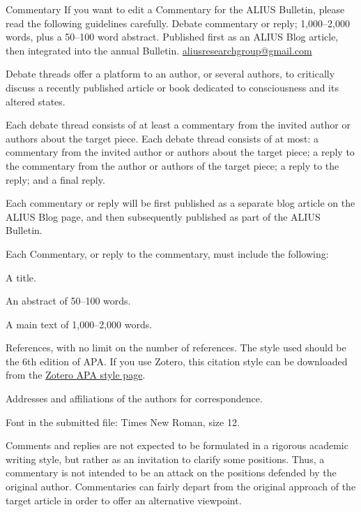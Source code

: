 \documentclass[11pt]{article}
\begin{document}
\guideHeader
  {Commentary}
  {If you want to edit a Commentary for the ALIUS Bulletin, please read the following guidelines carefully.}
  {Debate commentary or reply; 1,000--2,000 words, plus a 50--100 word abstract.}
  {Published first as an ALIUS Blog article, then integrated into the annual Bulletin.}
  {\href{mailto:aliusresearchgroup@gmail.com}{aliusresearchgroup@gmail.com}}

Debate threads offer a platform to an author, or several authors, to critically discuss a recently published article or book dedicated to consciousness and its altered states.

Each debate thread consists of at least a commentary from the invited author or authors about the target piece. Each debate thread consists of at most: a commentary from the invited author or authors about the target piece; a reply to the commentary from the author or authors of the target piece; a reply to the reply; and a final reply.

Each commentary or reply will be first published as a separate blog article on the ALIUS Blog page, and then subsequently published as part of the ALIUS Bulletin.


Each Commentary, or reply to the commentary, must include the following:

\begin{guideChecklist}
\item A title.
\item An abstract of 50--100 words.
\item A main text of 1,000--2,000 words.
\item References, with no limit on the number of references. The style used should be the 6th edition of APA. If you use Zotero, this citation style can be downloaded from the \href{https://www.zotero.org/styles?q=id%3Aapa}{Zotero APA style page}.
\item Addresses and affiliations of the authors for correspondence.
\item Font in the submitted file: Times New Roman, size 12.
\end{guideChecklist}


Comments and replies are not expected to be formulated in a rigorous academic writing style, but rather as an invitation to clarify some positions. Thus, a commentary is not intended to be an attack on the positions defended by the original author. Commentaries can fairly depart from the original approach of the target article in order to offer an alternative viewpoint.
\end{document}
